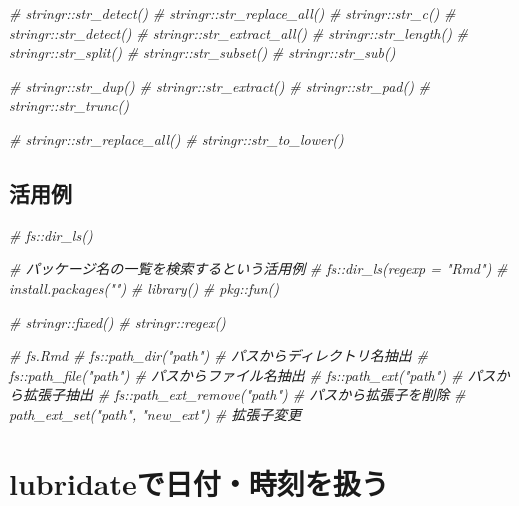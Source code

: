 \documentclass[
]{article}
\newenvironment{Shaded}{\begin{snugshade}}{\end{snugshade}}
\newcommand{\CommentTok}[1]{\textcolor[rgb]{0.56,0.35,0.01}{\textit{#1}}}
\begin{document}
\begin{Shaded}
\begin{Highlighting}[]
  \CommentTok{\# stringr::str\_detect()}
  \CommentTok{\# stringr::str\_replace\_all()}
  \CommentTok{\# stringr::str\_c()}
  \CommentTok{\# stringr::str\_detect()}
  \CommentTok{\# stringr::str\_extract\_all()}
  \CommentTok{\# stringr::str\_length()}
  \CommentTok{\# stringr::str\_split()}
  \CommentTok{\# stringr::str\_subset()}
  \CommentTok{\# stringr::str\_sub()}

  \CommentTok{\# stringr::str\_dup()}
  \CommentTok{\# stringr::str\_extract()}
  \CommentTok{\# stringr::str\_pad()}
  \CommentTok{\# stringr::str\_trunc()}

  \CommentTok{\# stringr::str\_replace\_all()}
  \CommentTok{\# stringr::str\_to\_lower()}
\end{Highlighting}
\end{Shaded}

\hypertarget{ux6d3bux7528ux4f8b}{%
\subsection{活用例}\label{ux6d3bux7528ux4f8b}}

\begin{Shaded}
\begin{Highlighting}[]
  \CommentTok{\# fs::dir\_ls()}

  \CommentTok{\# パッケージ名の一覧を検索するという活用例}
  \CommentTok{\# fs::dir\_ls(regexp = "Rmd")}
  \CommentTok{\# install.packages("")}
  \CommentTok{\# library()}
  \CommentTok{\# pkg::fun()}


  \CommentTok{\# stringr::fixed()}
  \CommentTok{\# stringr::regex()}

  \CommentTok{\# fs.Rmd}
  \CommentTok{\# fs::path\_dir("path")         \# パスからディレクトリ名抽出   }
  \CommentTok{\# fs::path\_file("path")        \# パスからファイル名抽出   }
  \CommentTok{\# fs::path\_ext("path")         \# パスから拡張子抽出   }
  \CommentTok{\# fs::path\_ext\_remove("path")  \# パスから拡張子を削除   }
  \CommentTok{\# path\_ext\_set("path", "new\_ext")   \# 拡張子変更   }
\end{Highlighting}
\end{Shaded}

\hypertarget{lubridate}{%
\section{lubridateで日付・時刻を扱う}\label{lubridate}}
\end{document}

